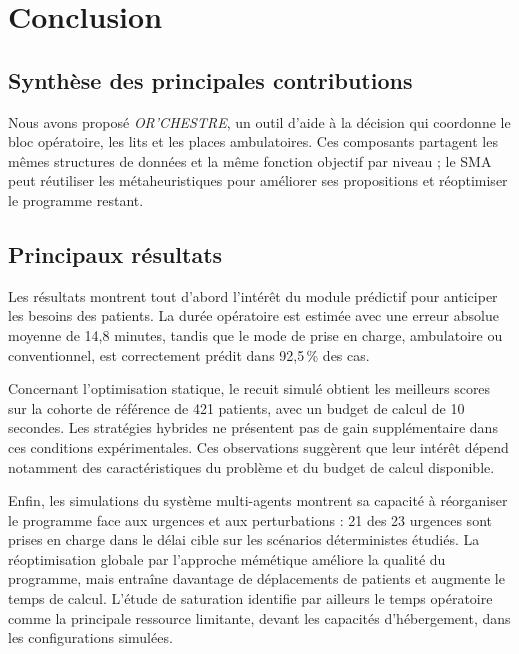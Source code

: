 \documentclass[11pt,a4paper]{article}
\begin{document}
\section{Conclusion}
\label{sec:conclusion}

\subsection{Synthèse des principales contributions}

Nous avons proposé \emph{OR'CHESTRE}, un outil d'aide à la décision qui coordonne le bloc opératoire, les lits et les places ambulatoires. Ces composants partagent les mêmes structures de données et la même fonction objectif par niveau ; le SMA peut réutiliser les métaheuristiques pour améliorer ses propositions et réoptimiser le programme restant.

\subsection{Principaux résultats}

Les résultats montrent tout d'abord l'intérêt du module prédictif pour anticiper les besoins des patients. La durée opératoire est estimée avec une erreur absolue moyenne de 14,8 minutes, tandis que le mode de prise en charge, ambulatoire ou conventionnel, est correctement prédit dans 92,5\,\% des cas.

Concernant l'optimisation statique, le recuit simulé obtient les meilleurs scores sur la cohorte de référence de 421 patients, avec un budget de calcul de 10 secondes. Les stratégies hybrides ne présentent pas de gain supplémentaire dans ces conditions expérimentales. Ces observations suggèrent que leur intérêt dépend notamment des caractéristiques du problème et du budget de calcul disponible.

Enfin, les simulations du système multi-agents montrent sa capacité à réorganiser le programme face aux urgences et aux perturbations : 21 des 23 urgences sont prises en charge dans le délai cible sur les scénarios déterministes étudiés. La réoptimisation globale par l'approche mémétique améliore la qualité du programme, mais entraîne davantage de déplacements de patients et augmente le temps de calcul. L'étude de saturation identifie par ailleurs le temps opératoire comme la principale ressource limitante, devant les capacités d'hébergement, dans les configurations simulées.
\end{document}
